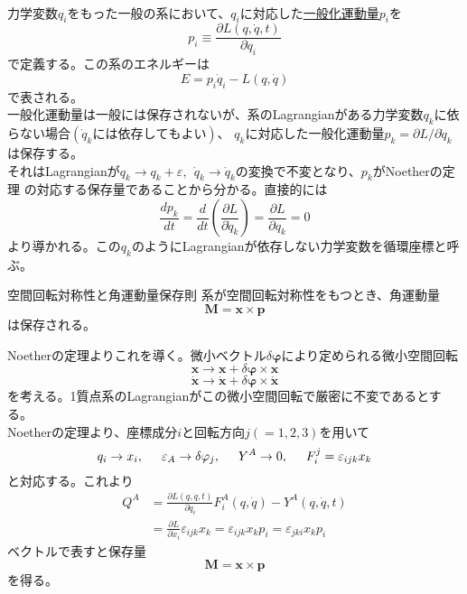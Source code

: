 \documentclass{jsarticle}
\begin{document}
\\
力学変数\(q_{i}\)をもった一般の系において、\(q_{i}\)に対応した\underline{一般化運動量}\(p_{i}\)を
\[p_{i}\equiv\frac{\partial L(q,\dot{q},t)}{\partial\dot{q}_{i}}\]
で定義する。この系のエネルギーは
\[E=p_{i}\dot{q}_{i}-L(q,\dot{q})\]
で表される。\\
一般化運動量は一般には保存されないが、系のLagrangianがある力学変数\(q_{k}\)に依らない場合\((\dot{q}_{k}には依存してもよい)\)、
\(q_{k}\)に対応した一般化運動量\(p_{k}=\partial L/\partial\dot{q}_{k}\)は保存する。\\
それはLagrangianが\(q_{k}\to q_{k}+\varepsilon,~~\dot{q}_{k}\to\dot{q}_{k}\)の変換で不変となり、\(p_{k}\)がNoetherの定理
の対応する保存量であることから分かる。直接的には
\[\frac{dp_{k}}{dt}=\frac{d}{dt}\left(\frac{\partial L}{\partial\dot{q}_{k}}\right)=\frac{\partial L}{\partial q_{k}}=0\]
より導かれる。この\(q_{k}\)のようにLagrangianが依存しない力学変数を循環座標と呼ぶ。\\

\newpage
\begin{itembox}[l]{空間回転対称性と角運動量保存則}
    系が空間回転対称性をもつとき、角運動量
    \[\bm{M}=\bm{x}\times\bm{p}\]
    は保存される。
\end{itembox}
Noetherの定理よりこれを導く。微小ベクトル\(\delta\bm{\varphi}\)により定められる微小空間回転
\[\bm{x}\longrightarrow\bm{x}+\delta\bm{\varphi}\times\bm{x}\]
\[\dot{\bm{x}}\longrightarrow\dot{\bm{x}}+\delta\bm{\varphi}\times\dot{\bm{x}}\]
を考える。1質点系のLagrangianがこの微小空間回転で厳密に不変であるとする。\\
Noetherの定理より、座標成分\(i\)と回転方向\(j(=1,2,3)\)を用いて
\[q_{i}\to x_{i},\hspace{5mm}\varepsilon_{A}\to\delta\varphi_{j},\hspace{5mm}Y^{A}\to0,
\hspace{5mm}F_{i}^{j}=\varepsilon_{ijk}x_{k}\]
と対応する。これより
\begin{align*}
    Q^{A}&=\frac{\partial L(q,\dot{q},t)}{\partial\dot{q}_{i}}F_{i}^{A}(q,\dot{q})-Y^{A}(q,\dot{q},t)\\
    &=\frac{\partial L}{\partial\dot{x}_{i}}\varepsilon_{ijk}x_{k}=\varepsilon_{ijk}x_{k}p_{i}=\varepsilon_{jki}x_{k}p_{i}
\end{align*}
ベクトルで表すと保存量
\[\bm{M}=\bm{x}\times\bm{p}\]
を得る。\\
\\
\end{document}
